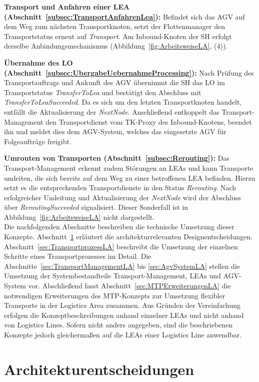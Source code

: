 \textbf{Transport und Anfahren einer LEA (Abschnitt~\ref{subsec:TransportAnfahrenLea}):} Befindet sich das AGV auf dem Weg zum nächsten Transportknoten, setzt der Flottenmanager den Transportstatus erneut auf \emph{Transport}. Am Inbound-Knoten der SH erfolgt derselbe Anbindungsmechanismus (Abbildung~\ref{fig:ArbeitsweiseLA}, (4)).

\textbf{Übernahme des LO (Abschnitt~\ref{subsec:UbergabeUebernahmeProcessing}):} Nach Prüfung des Transportauftrags und Ankunft des AGV übernimmt die SH das LO im Transportstatus \emph{TransferToLea} und bestätigt den Abschluss mit \emph{TransferToLeaSucceeded}. Da es sich um den letzten Transportknoten handelt, entfällt die Aktualisierung der \emph{NextNode}. Anschließend entkoppelt das Transport-Management den Transportdienst vom TK-Proxy des Inbound-Knotens, beendet ihn und meldet dies dem AGV-System, welches das eingesetzte AGV für Folgeaufträge freigibt.

\textbf{Umrouten von Transporten (Abschnitt~\ref{subsec:Rerouting}):} Das Transport-Management erkennt zudem Störungen an LEAs und kann Transporte umleiten, die sich bereits auf dem Weg zu einer betroffenen LEA befinden. Hierzu setzt es die entsprechenden Transportdienste in den Status \emph{Rerouting}. Nach erfolgreicher Umleitung und Aktualisierung der \emph{NextNode} wird der Abschluss über \emph{ReroutingSucceeded} signalisiert. Dieser Sonderfall ist in Abbildung~\ref{fig:ArbeitsweiseLA} nicht dargestellt.\\

Die nachfolgenden Abschnitte beschreiben die technische Umsetzung dieser Konzepte. Abschnitt~\ref{sec:ArchitekturentscheidungenLA} erläutert die architekturrelevanten Designentscheidungen. Abschnitt~\ref{sec:TransportprozessLA} beschreibt die Umsetzung der einzelnen Schritte eines Transportprozesses im Detail. Die Abschnitte~\ref{sec:TransportManagementLA} bis \ref{sec:AgvSystemLA} stellen die Umsetzung der Systembestandteile Transport-Management, LEAs und AGV-System vor. Abschließend fasst Abschnitt~\ref{sec:MTPErweiterungenLA} die notwendigen Erweiterungen des MTP-Konzepts zur Umsetzung flexibler Transporte in der Logistics Area zusammen. Aus Gründen der Vereinfachung erfolgen die Konzeptbeschreibungen anhand einzelner LEAs und nicht anhand von Logistics Lines. Sofern nicht anders angegeben, sind die beschriebenen Konzepte jedoch gleichermaßen auf die LEAs einer Logistics Line anwendbar.

\section{Architekturentscheidungen}
\label{sec:ArchitekturentscheidungenLA}

